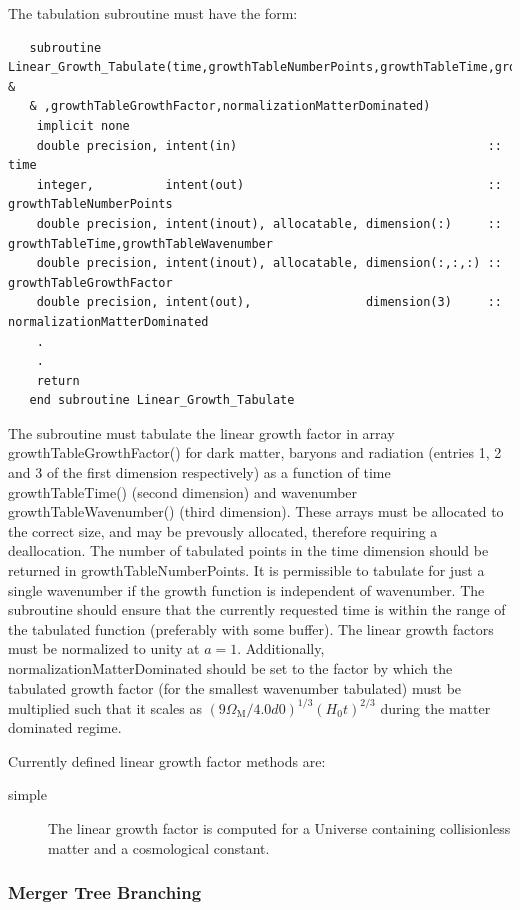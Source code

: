 The tabulation subroutine must have the form:
\begin{verbatim}
   subroutine Linear_Growth_Tabulate(time,growthTableNumberPoints,growthTableTime,growthTableWavenumber &
   & ,growthTableGrowthFactor,normalizationMatterDominated)
    implicit none
    double precision, intent(in)                                   :: time
    integer,          intent(out)                                  :: growthTableNumberPoints
    double precision, intent(inout), allocatable, dimension(:)     :: growthTableTime,growthTableWavenumber
    double precision, intent(inout), allocatable, dimension(:,:,:) :: growthTableGrowthFactor
    double precision, intent(out),                dimension(3)     :: normalizationMatterDominated
    .
    .
    return
   end subroutine Linear_Growth_Tabulate
\end{verbatim}
The subroutine must tabulate the linear growth factor in array {\normalfont \ttfamily growthTableGrowthFactor()} for dark matter, baryons and radiation (entries 1, 2 and 3 of the first dimension respectively) as a function of time {\normalfont \ttfamily growthTableTime()} (second dimension) and wavenumber {\normalfont \ttfamily growthTableWavenumber()} (third dimension). These arrays must be allocated to the correct size, and may be prevously allocated, therefore requiring a deallocation. The number of tabulated points in the time dimension should be returned in {\normalfont \ttfamily growthTableNumberPoints}. It is permissible to tabulate for just a single wavenumber if the growth function is independent of wavenumber. The subroutine should ensure that the currently requested {\normalfont \ttfamily time} is within the range of the tabulated function (preferably with some buffer). The linear growth factors must be normalized to unity at $a=1$. Additionally, {\normalfont \ttfamily normalizationMatterDominated} should be set to the factor by which the tabulated growth factor (for the smallest wavenumber tabulated) 
must be multiplied such that it scales as $(9 \Omega_{\mathrm M} / 4.0d0)^{1/3} (H_0 t)^{2/3}$ during the matter dominated regime.

Currently defined linear growth factor methods are:
\begin{description}
 \item [{\normalfont \ttfamily simple}] The linear growth factor is computed for a Universe containing collisionless matter and a cosmological constant.
\end{description}

\subsubsection{Merger Tree Branching}

